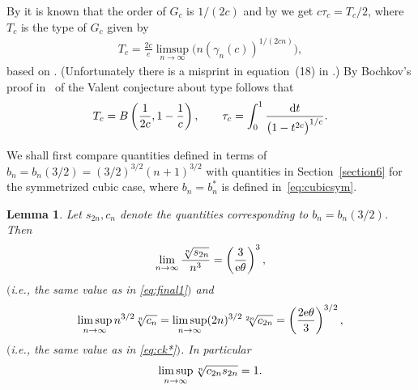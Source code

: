 \documentclass[pdftex]{sigma}
\numberwithin{equation}{section}
\newtheorem{lem}[thm]{Lemma}
\begin{document}
By \cite[Remark 1.6]{B:S3} it is known that the order of $G_c$ is $1/(2c)$ and by \cite[Theorem 1.11]{B:S3} we get $c\tau_c=T_c/2$, where $T_c$ is the type of $G_{c}$ given by
\begin{gather*}
T_c=\frac{2c}{e}\limsup_{n\to\infty}\big(n(\gamma_n(c))^{1/(2cn)}\big),
\end{gather*}
based on \cite{Le}. (Unfortunately there is a misprint in equation~(18) in \cite[p.~339]{B:S3}.) By Bochkov's proof in~\cite{Bo} of the Valent conjecture about type follows that
\begin{gather*}
T_c=B\left(\frac{1}{2c},1-\frac{1}{c}\right),\qquad \tau_c=\int_0^1\frac{{\rm d}t}{\big(1-t^{2c}\big)^{1/c}}.
\end{gather*}

We shall first compare quantities defined in terms of $b_n=b_n(3/2)=(3/2)^{3/2}(n+1)^{3/2}$ with quantities in Section~\ref{section6} for the symmetrized cubic case, where $b_n=b_n^*$ is defined in~\eqref{eq:cubicsym}.

\begin{lem}\label{thm:3/2-cub}Let $s_{2n},c_n$ denote the quantities corresponding to $b_n= b_n(3/2)$. Then
\begin{gather}\label{eq:3/2-s2n}
\lim_{n\to\infty}\frac{\root{n}\of{s_{2n}}}{n^3}=\left(\frac{3}{{\rm e}\theta}\right)^3,
\end{gather}
$($i.e., the same value as in \eqref{eq:final1}$)$ and
\begin{gather}\label{eq:3/2-cn}
\limsup_{n\to\infty} n^{3/2}\root{n}\of{c_n}=\limsup_{n\to\infty} (2n)^{3/2}\root{2n}\of{c_{2n}}=\left(\frac{2 {\rm e} \theta}{3}\right)^{3/2},
\end{gather}
$($i.e., the same value as in \eqref{eq:ck*}$)$. In particular
\begin{gather}\label{eq:3/2-cn-sn}
\limsup_{n\to\infty}\root{n} \of{c_{2n}s_{2n}}=1.
\end{gather}
\end{lem}
\end{document}
